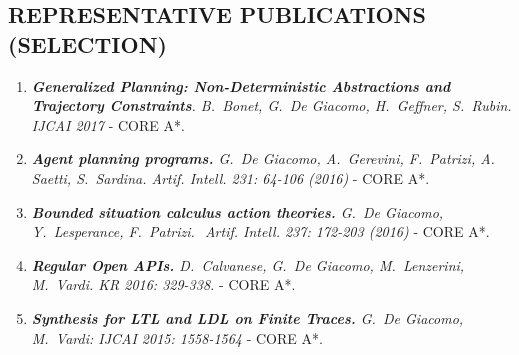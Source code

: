 \vspace{-3ex}
\subsection*{REPRESENTATIVE PUBLICATIONS (SELECTION)}
\vspace{-3ex}

\begin{enumerate}[topsep=0pt,itemsep=-1ex,partopsep=1ex,parsep=1ex]


\item \textit{\textbf{Generalized Planning: Non-Deterministic Abstractions and Trajectory Constraints}. B.\ Bonet, G.\ De Giacomo, H.\ Geffner, S.\ Rubin. IJCAI 2017} - CORE  A*. %


\item \textit{\textbf{Agent planning programs.} G.\ De Giacomo, A.\ Gerevini, F.\ Patrizi, A.\, Saetti, S.\ Sardina. Artif. Intell. 231: 64-106 (2016)} - CORE  A*. %

 \item \textit{\textbf{Bounded situation calculus action theories.} G.\ De Giacomo, Y.\ Lesperance, F.\ Patrizi.  Artif. Intell. 237: 172-203 (2016)} - CORE  A*. %

\item \textit{\textbf{Regular Open APIs.}
D.\ Calvanese, G.\ De Giacomo, M.\ Lenzerini, M.\ Vardi. KR 2016: 329-338.}  - CORE  A*. %

\item \textit{\textbf{Synthesis for LTL and LDL on Finite Traces.} G.\ De Giacomo, M.\ Vardi: IJCAI 2015: 1558-1564} - CORE  A*. %




\end{enumerate}
